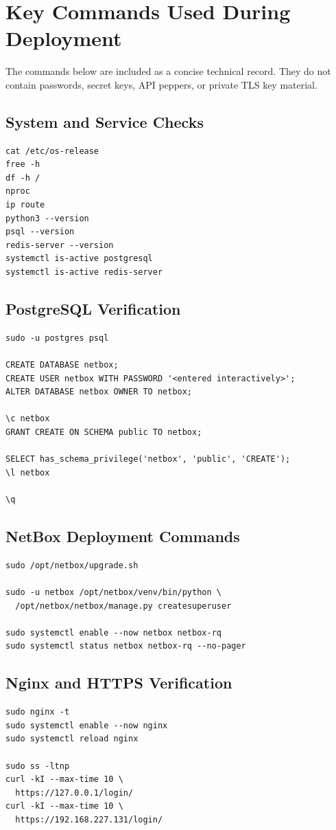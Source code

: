 \documentclass[11pt,a4paper,oneside]{report}
\begin{document}
\chapter{Key Commands Used During Deployment}

The commands below are included as a concise technical record. They do not contain passwords, secret keys, API peppers, or private TLS key material.

\section{System and Service Checks}
\begin{lstlisting}
cat /etc/os-release
free -h
df -h /
nproc
ip route
python3 --version
psql --version
redis-server --version
systemctl is-active postgresql
systemctl is-active redis-server
\end{lstlisting}

\section{PostgreSQL Verification}
\begin{lstlisting}
sudo -u postgres psql

CREATE DATABASE netbox;
CREATE USER netbox WITH PASSWORD '<entered interactively>';
ALTER DATABASE netbox OWNER TO netbox;

\c netbox
GRANT CREATE ON SCHEMA public TO netbox;

SELECT has_schema_privilege('netbox', 'public', 'CREATE');
\l netbox

\q
\end{lstlisting}

\section{NetBox Deployment Commands}
\begin{lstlisting}
sudo /opt/netbox/upgrade.sh

sudo -u netbox /opt/netbox/venv/bin/python \
  /opt/netbox/netbox/manage.py createsuperuser

sudo systemctl enable --now netbox netbox-rq
sudo systemctl status netbox netbox-rq --no-pager
\end{lstlisting}

\section{Nginx and HTTPS Verification}
\begin{lstlisting}
sudo nginx -t
sudo systemctl enable --now nginx
sudo systemctl reload nginx

sudo ss -ltnp
curl -kI --max-time 10 \
  https://127.0.0.1/login/
curl -kI --max-time 10 \
  https://192.168.227.131/login/
\end{lstlisting}
\end{document}
